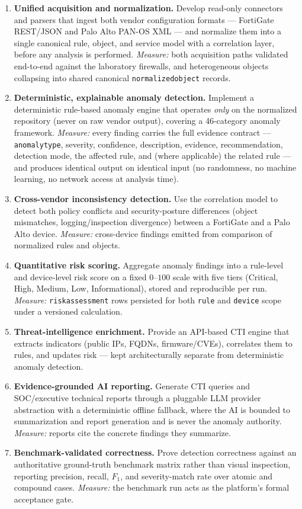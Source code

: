 \documentclass[12pt,a4paper]{report}
\renewcommand{\_}{\textunderscore\allowbreak}
\begin{document}
\begin{enumerate}[leftmargin=1.7em, label=\textbf{O\arabic*.}]
  \item \textbf{Unified acquisition and normalization.} Develop read-only connectors and parsers that ingest both vendor configuration formats --- FortiGate REST/JSON and Palo Alto PAN-OS XML --- and normalize them into a single canonical rule, object, and service model with a correlation layer, before any analysis is performed. \emph{Measure:} both acquisition paths validated end-to-end against the laboratory firewalls, and heterogeneous objects collapsing into shared canonical \texttt{normalized\_object} records.
  \item \textbf{Deterministic, explainable anomaly detection.} Implement a deterministic rule-based anomaly engine that operates \emph{only} on the normalized repository (never on raw vendor output), covering a 46-category anomaly framework. \emph{Measure:} every finding carries the full evidence contract --- \texttt{anomaly\_type}, severity, confidence, description, evidence, recommendation, detection mode, the affected rule, and (where applicable) the related rule --- and produces identical output on identical input (no randomness, no machine learning, no network access at analysis time).
  \item \textbf{Cross-vendor inconsistency detection.} Use the correlation model to detect both policy conflicts and security-posture differences (object mismatches, logging/inspection divergence) between a FortiGate and a Palo Alto device. \emph{Measure:} cross-device findings emitted from comparison of normalized rules and objects.
  \item \textbf{Quantitative risk scoring.} Aggregate anomaly findings into a rule-level and device-level risk score on a fixed $0$--$100$ scale with five tiers (Critical, High, Medium, Low, Informational), stored and reproducible per run. \emph{Measure:} \texttt{risk\_assessment} rows persisted for both \texttt{rule} and \texttt{device} scope under a versioned calculation.
  \item \textbf{Threat-intelligence enrichment.} Provide an API-based CTI engine that extracts indicators (public IPs, FQDNs, firmware/CVEs), correlates them to rules, and updates risk --- kept architecturally separate from deterministic anomaly detection.
  \item \textbf{Evidence-grounded AI reporting.} Generate CTI queries and SOC/executive technical reports through a pluggable LLM provider abstraction with a deterministic offline fallback, where the AI is bounded to summarization and report generation and is never the anomaly authority. \emph{Measure:} reports cite the concrete findings they summarize.
  \item \textbf{Benchmark-validated correctness.} Prove detection correctness against an authoritative ground-truth benchmark matrix rather than visual inspection, reporting precision, recall, $F_1$, and severity-match rate over atomic and compound cases. \emph{Measure:} the benchmark run acts as the platform's formal acceptance gate.
\end{enumerate}
\end{document}
